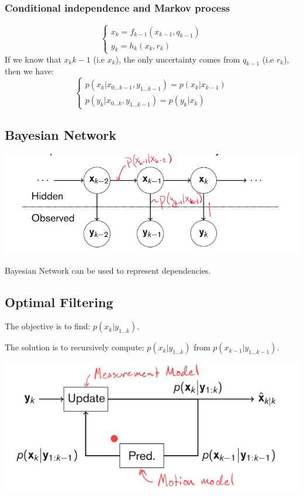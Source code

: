 \subsubsection{Conditional independence and Markov process}
\begin{equation}
    \left\{\begin{array}{c}
        x_k = f_{k-1}(x_{k-1}, q_{k-1}) \\
        y_k = h_k(x_k, r_k)
    \end{array}\right.
\end{equation}
If we know that $x_k{k-1}$ (i.e $x_k$), the only uncertainty comes from $q_{k-1}$ (i.e $r_k$), then we have:
\begin{equation}
    \left\{\begin{array}{c}
        p(x_k|x_{0\dots k-1}, y_{1\dots k-1}) = p(x_k|x_{k-1}) \\
        p(y_k|x_{0\dots k}, y_{1 \dots k-1}) = p(y_k | x_k) 
    \end{array}
    \right.
\end{equation}

\subsection{Bayesian Network}
\includegraphics[scale=0.5]{content/Bayesian_Network.png}


Bayesian Network can be used to represent dependencies.



\subsection{Optimal Filtering}
The objective is to find: $p(x_k | y_{1 \dots k})$.

The solution is to recursively compute: $p(x_k | y_{1\dots k})$ from $p(x_{k-1} | y_{1\dots k-1})$.

\includegraphics[scale=0.5]{content/Optimal_Filtering.png}

